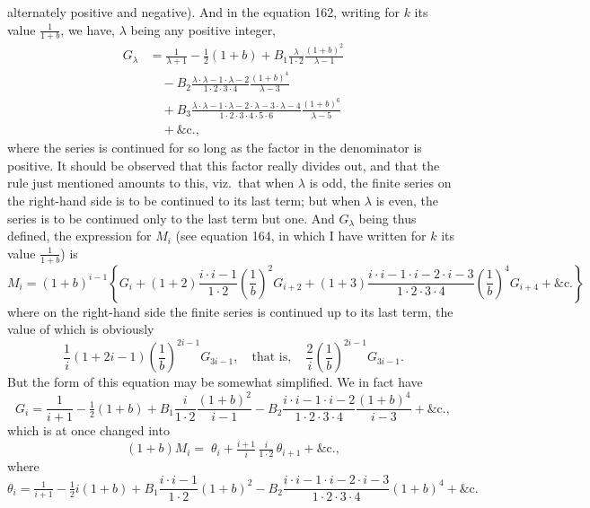 \documentclass[11pt,a4paper]{article}
\begin{document}
alternately positive and negative). And in the equation 162, writing for $k$ its value $\frac{1}{1+b}$, we have, $\lambda$ being any positive integer,
\[
\begin{aligned}
G_{\lambda} &= \frac{1}{\lambda+1}-\tfrac{1}{2}(1+b) + B_{1}\frac{\lambda}{1 \cdot 2}\frac{(1+b)^{2}}{\lambda - 1} \\
&\quad{} - B_{2}\frac{\lambda \cdot \lambda - 1 \cdot \lambda - 2}{1 \cdot 2 \cdot 3 \cdot 4} \frac{(1+b)^{4}}{\lambda - 3} \\
&\quad{} + B_{3}\frac{\lambda \cdot \lambda - 1 \cdot \lambda - 2 \cdot \lambda - 3 \cdot \lambda - 4}{1 \cdot 2 \cdot 3 \cdot 4 \cdot 5 \cdot 6}\frac{(1+b)^{6}}{\lambda - 5} \\
&\quad{} + \&\mathrm{c}.,
\end{aligned}
\]
where the series is continued for so long as the factor in the denominator is positive. It should be observed that this factor really divides out, and that the rule just mentioned amounts to this, viz.\ that when $\lambda$ is odd, the finite series on the right-hand side is to be continued to its last term; but when $\lambda$ is even, the series is to be continued only to the last term but one. And $G_{\lambda}$ being thus defined, the expression for $M_{i}$ (see equation 164, in which I have written for $k$ its value $\frac{1}{1+b}$) is
\[
M_{i} = (1+b)^{i-1}\left\{ G_{i} + (1+2)\frac{i \cdot i-1}{1 \cdot 2} \left(\frac{1}{b}\right)^{2} G_{i+2} + (1+3)\frac{i \cdot i-1 \cdot i-2 \cdot i-3}{1 \cdot 2 \cdot 3 \cdot 4} \left(\frac{1}{b}\right)^{4} G_{i+4} + \&\mathrm{c}.\right\}
\]
where on the right-hand side the finite series is continued up to its last term, the value of which is obviously
\[
\frac{1}{i}(1+2i-1)\left(\frac{1}{b}\right)^{2i-1} G_{3i-1},\quad \text{that is},\quad \frac{2}{i}\left(\frac{1}{b}\right)^{2i-1} G_{3i-1}.
\]
But the form of this equation may be somewhat simplified. We in fact have
\[
G_{i} = \frac{1}{i+1} - \tfrac{1}{2}(1+b) + B_{1}\frac{i}{1 \cdot 2}\frac{(1+b)^{2}}{i-1} - B_{2}\frac{i \cdot i-1 \cdot i-2}{1 \cdot 2 \cdot 3 \cdot 4}\frac{(1+b)^{4}}{i-3} + \&\mathrm{c.},
\]
which is at once changed into
\[
(1+b) M_{i} = \;\theta_{i} + \tfrac{i+1}{i}\,\tfrac{i}{1 \cdot 2}\,\theta_{i+1} + \&\mathrm{c.},
\]
where
\[
\theta_{i} = \tfrac{1}{i+1}-\tfrac{1}{2}i(1+b) + B_{1}\frac{i \cdot i-1}{1 \cdot 2}(1+b)^{2} - B_{2}\frac{i \cdot i-1 \cdot i-2 \cdot i-3}{1 \cdot 2 \cdot 3 \cdot 4}(1+b)^{4} + \&\mathrm{c.}
\]

\setcounter{page}{94}
\end{document}
